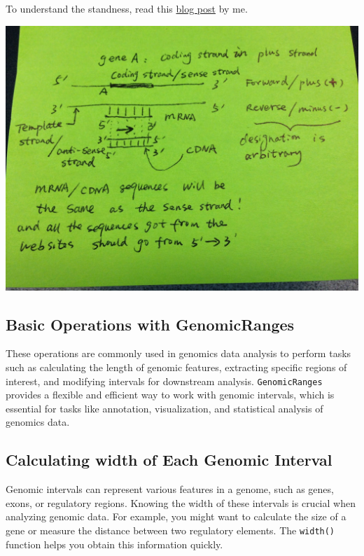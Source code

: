 \documentclass[
]{book}
\begin{document}
To understand the standness, read this \href{https://crazyhottommy.blogspot.com/2014/08/understanding-forward-strand-and.html}{blog post} by me.

\includegraphics{images/strandness.jpeg}

\hypertarget{basic-operations-with-genomicranges}{%
\subsection{Basic Operations with GenomicRanges}\label{basic-operations-with-genomicranges}}

These operations are commonly used in genomics data analysis to perform tasks such as calculating the length of genomic features, extracting specific regions of interest, and modifying intervals for downstream analysis. \texttt{GenomicRanges} provides a flexible and efficient way to work with genomic intervals, which is essential for tasks like annotation, visualization, and statistical analysis of genomics data.

\hypertarget{calculating-width-of-each-genomic-interval}{%
\subsection{Calculating width of Each Genomic Interval}\label{calculating-width-of-each-genomic-interval}}

Genomic intervals can represent various features in a genome, such as genes, exons, or regulatory regions. Knowing the width of these intervals is crucial when analyzing genomic data. For example, you might want to calculate the size of a gene or measure the distance between two regulatory elements. The \texttt{width()} function helps you obtain this information quickly.
\end{document}
